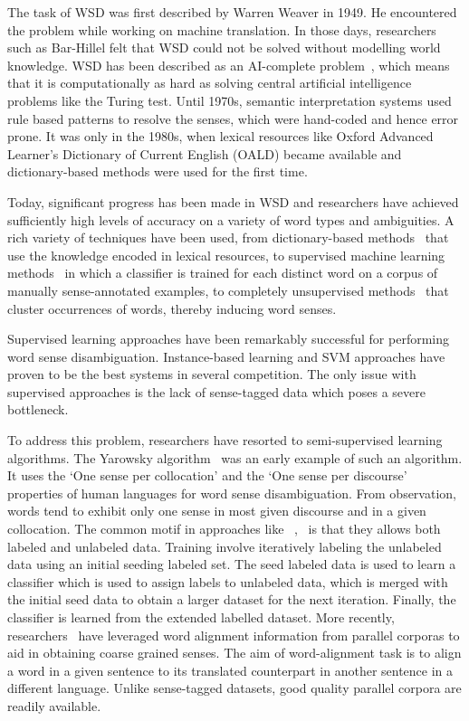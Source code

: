 \documentclass[12pt,letterpaper]{article}
\begin{document}
The task of WSD was first described by Warren Weaver in 1949. He encountered the problem while working on machine translation. In those days, researchers such as Bar-Hillel felt that WSD could not be solved without modelling world knowledge. WSD has been described as an AI-complete problem~\cite{mallery1988thinking}, which means that it is computationally as hard as solving central artificial intelligence problems like the Turing test. Until 1970s, semantic interpretation systems used rule based patterns to resolve the senses, which were hand-coded and hence error prone. It was only in the 1980s, when lexical resources like Oxford Advanced Learner's Dictionary of Current English (OALD) became available and dictionary-based methods were used for the first time. 

Today, significant progress has been made in WSD and researchers have achieved sufficiently high levels of accuracy on a variety of word types and ambiguities. A rich variety of techniques have been used, from dictionary-based methods~\cite{mihalcea2007using} that use the knowledge encoded in lexical resources, to supervised machine learning methods~\cite{manning1999foundations} in which a classifier is trained for each distinct word on a corpus of manually sense-annotated examples, to completely unsupervised methods~\cite{yarowsky1995unsupervised} that cluster occurrences of words, thereby inducing word senses.

Supervised learning approaches have been remarkably successful for performing word sense disambiguation. Instance-based learning and SVM approaches have proven to be the best systems in several competition. The only issue with supervised approaches is the lack of sense-tagged data which poses a severe bottleneck. 

To address this problem, researchers have resorted to semi-supervised learning algorithms. The Yarowsky algorithm~\cite{yarowsky1995unsupervised} was an early example of such an algorithm. It uses the `One sense per collocation' and the `One sense per discourse' properties of human languages for word sense disambiguation. From observation, words tend to exhibit only one sense in most given discourse and in a given collocation. The common motif in approaches like ~\cite{yarowsky1995unsupervised},~\cite{le2008semi} is that they allows both labeled and unlabeled data. Training involve iteratively labeling the unlabeled data using an initial seeding labeled set. The seed labeled data is used to learn a classifier which is used to assign labels to unlabeled data, which is merged with the initial seed data to obtain a larger dataset for the next iteration. Finally, the classifier is learned from the extended labelled dataset.
More recently, researchers~\cite{Ng} have leveraged word alignment information from parallel corporas to aid in obtaining coarse grained senses. The aim of word-alignment task is to align a word in a given sentence to its translated counterpart in another sentence in a different language. Unlike sense-tagged datasets, good quality parallel corpora are readily available. 
\end{document}
